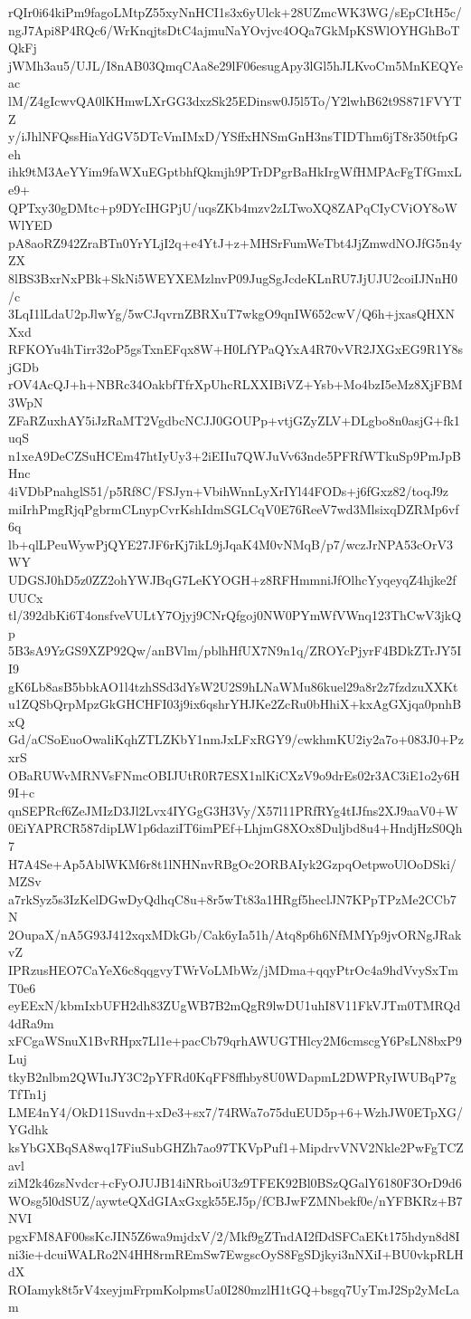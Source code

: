 rQIr0i64kiPm9fagoLMtpZ55xyNnHCI1s3x6yUlck+28UZmcWK3WG/sEpCItH5c/
ngJ7Api8P4RQc6/WrKnqjtsDtC4ajmuNaYOvjvc4OQa7GkMpKSWlOYHGhBoTQkFj
jWMh3au5/UJL/I8nAB03QmqCAa8e29lF06esugApy3lGl5hJLKvoCm5MnKEQYeac
lM/Z4gIcwvQA0lKHmwLXrGG3dxzSk25EDinsw0J5l5To/Y2lwhB62t9S871FVYTZ
y/iJhlNFQssHiaYdGV5DTcVmIMxD/YSffxHNSmGnH3nsTIDThm6jT8r350tfpGeh
ihk9tM3AeYYim9faWXuEGptbhfQkmjh9PTrDPgrBaHkIrgWfHMPAcFgTfGmxLe9+
QPTxy30gDMtc+p9DYcIHGPjU/uqsZKb4mzv2zLTwoXQ8ZAPqCIyCViOY8oWWlYED
pA8aoRZ942ZraBTn0YrYLjI2q+e4YtJ+z+MHSrFumWeTbt4JjZmwdNOJfG5n4yZX
8lBS3BxrNxPBk+SkNi5WEYXEMzlnvP09JugSgJcdeKLnRU7JjUJU2coiIJNnH0/c
3LqI1lLdaU2pJlwYg/5wCJqvrnZBRXuT7wkgO9qnIW652cwV/Q6h+jxasQHXNXxd
RFKOYu4hTirr32oP5gsTxnEFqx8W+H0LfYPaQYxA4R70vVR2JXGxEG9R1Y8sjGDb
rOV4AcQJ+h+NBRc34OakbfTfrXpUhcRLXXIBiVZ+Ysb+Mo4bzI5eMz8XjFBM3WpN
ZFaRZuxhAY5iJzRaMT2VgdbcNCJJ0GOUPp+vtjGZyZLV+DLgbo8n0asjG+fk1uqS
n1xeA9DeCZSuHCEm47htIyUy3+2iEIIu7QWJuVv63nde5PFRfWTkuSp9PmJpBHnc
4iVDbPnahglS51/p5Rf8C/FSJyn+VbihWnnLyXrIYl44FODs+j6fGxz82/toqJ9z
miIrhPmgRjqPgbrmCLnypCvrKshIdmSGLCqV0E76ReeV7wd3MlsixqDZRMp6vf6q
lb+qlLPeuWywPjQYE27JF6rKj7ikL9jJqaK4M0vNMqB/p7/wczJrNPA53cOrV3WY
UDGSJ0hD5z0ZZ2ohYWJBqG7LeKYOGH+z8RFHmmniJfOlhcYyqeyqZ4hjke2fUUCx
tl/392dbKi6T4onsfveVULtY7Ojyj9CNrQfgoj0NW0PYmWfVWnq123ThCwV3jkQp
5B3sA9YzGS9XZP92Qw/anBVlm/pblhHfUX7N9n1q/ZROYcPjyrF4BDkZTrJY5II9
gK6Lb8asB5bbkAO1l4tzhSSd3dYsW2U2S9hLNaWMu86kuel29a8r2z7fzdzuXXKt
u1ZQSbQrpMpzGkGHCHFI03j9ix6qshrYHJKe2ZcRu0bHhiX+kxAgGXjqa0pnhBxQ
Gd/aCSoEuoOwaliKqhZTLZKbY1nmJxLFxRGY9/cwkhmKU2iy2a7o+083J0+PzxrS
OBaRUWvMRNVsFNmcOBIJUtR0R7ESX1nlKiCXzV9o9drEs02r3AC3iE1o2y6H9I+c
qnSEPRcf6ZeJMIzD3Jl2Lvx4IYGgG3H3Vy/X57l11PRfRYg4tIJfns2XJ9aaV0+W
0EiYAPRCR587dipLW1p6daziIT6imPEf+LhjmG8XOx8Duljbd8u4+HndjHzS0Qh7
H7A4Se+Ap5AblWKM6r8t1lNHNnvRBgOc2ORBAIyk2GzpqOetpwoUlOoDSki/MZSv
a7rkSyz5s3IzKelDGwDyQdhqC8u+8r5wTt83a1HRgf5heclJN7KPpTPzMe2CCb7N
2OupaX/nA5G93J412xqxMDkGb/Cak6yIa51h/Atq8p6h6NfMMYp9jvORNgJRakvZ
IPRzusHEO7CaYeX6c8qqgvyTWrVoLMbWz/jMDma+qqyPtrOc4a9hdVvySxTmT0e6
eyEExN/kbmIxbUFH2dh83ZUgWB7B2mQgR9lwDU1uhI8V11FkVJTm0TMRQd4dRa9m
xFCgaWSnuX1BvRHpx7Ll1e+pacCb79qrhAWUGTHlcy2M6cmscgY6PsLN8bxP9Luj
tkyB2nlbm2QWIuJY3C2pYFRd0KqFF8ffhby8U0WDapmL2DWPRyIWUBqP7gTfTn1j
LME4nY4/OkD11Suvdn+xDe3+sx7/74RWa7o75duEUD5p+6+WzhJW0ETpXG/YGdhk
ksYbGXBqSA8wq17FiuSubGHZh7ao97TKVpPuf1+MipdrvVNV2Nkle2PwFgTCZavl
ziM2k46zsNvdcr+cFyOJUJB14iNRboiU3z9TFEK92Bl0BSzQGalY6180F3OrD9d6
WOsg5l0dSUZ/aywteQXdGIAxGxgk55EJ5p/fCBJwFZMNbekf0e/nYFBKRz+B7NVI
pgxFM8AF00ssKcJIN5Z6wa9mjdxV/2/Mkf9gZTndAI2fDdSFCaEKt175hdyn8d8I
ni3ie+dcuiWALRo2N4HH8rmREmSw7EwgscOyS8FgSDjkyi3nNXiI+BU0vkpRLHdX
ROIamyk8t5rV4xeyjmFrpmKolpmsUa0I280mzlH1tGQ+bsgq7UyTmJ2Sp2yMcLam
